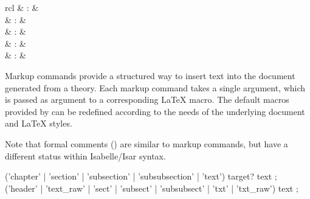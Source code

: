 \begin{isabellebody}
\begin{isamarkuptext}
\begin{matharray}{rcl}
    \hypertarget{command.sect}{\hyperlink{command.sect}{\mbox{}}} & : &  \\
    \hypertarget{command.subsect}{\hyperlink{command.subsect}{\mbox{}}} & : &  \\
    \hypertarget{command.subsubsect}{\hyperlink{command.subsubsect}{\mbox{}}} & : &  \\
    \hypertarget{command.txt}{\hyperlink{command.txt}{\mbox{}}} & : &  \\
    \hypertarget{command.txt-raw}{\hyperlink{command.txt-raw}{\mbox{}}} & : &  \\
  \end{matharray}

  Markup commands provide a structured way to insert text into the
  document generated from a theory.  Each markup command takes a
  single \hyperlink{syntax.text}{\mbox{}} argument, which is passed as argument to a
  corresponding {\LaTeX} macro.  The default macros provided by
  \hyperlink{file.~~/lib/texinputs/isabelle.sty}{\mbox{}} can be redefined according
  to the needs of the underlying document and {\LaTeX} styles.

  Note that formal comments () are similar to
  markup commands, but have a different status within Isabelle/Isar
  syntax.

  \begin{rail}
    ('chapter' | 'section' | 'subsection' | 'subsubsection' | 'text') target? text
    ;
    ('header' | 'text\_raw' | 'sect' | 'subsect' | 'subsubsect' | 'txt' | 'txt\_raw') text
    ;
  \end{rail}

  \begin{description}


\end{description}
\end{isamarkuptext}
\end{isabellebody}
